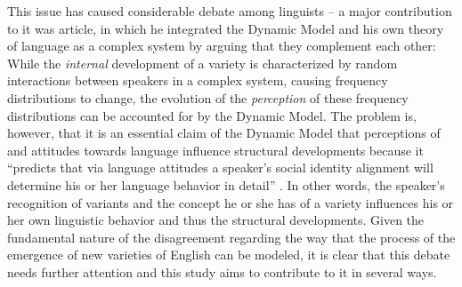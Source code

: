 This issue has caused considerable debate among linguists – a major contribution to it was  article, in which he integrated the Dynamic Model and his own theory of language as a complex system by arguing that they complement each other: While the \textit{internal} development of a variety is characterized by random interactions between speakers in a complex system, causing frequency distributions to change, the evolution of the \textit{perception} of these frequency distributions can be accounted for by the Dynamic Model. The problem is, however, that it is an essential claim of the Dynamic Model that perceptions of and attitudes towards language influence structural developments because it “predicts that via language attitudes a speaker’s social identity alignment will determine his or her language behavior in detail” \citep[95]{Schneider2007}. In other words, the speaker’s recognition of variants and the concept he or she has of a variety influences his or her own linguistic behavior and thus the structural developments. Given the fundamental nature of the disagreement regarding the way that the process of the emergence of new varieties of English can be modeled, it is clear that this debate needs further attention and this study aims to contribute to it in several ways.

